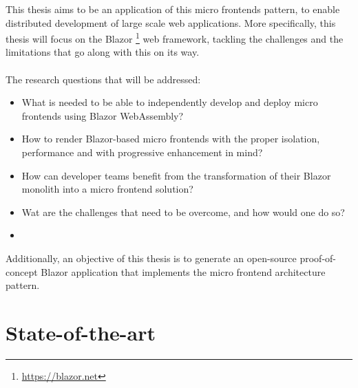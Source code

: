 This thesis aims to be an application of this micro frontends pattern, to enable
distributed development of large scale web applications. More specifically, this
thesis will focus on the Blazor \footnote{\href{https://blazor.net}{https://blazor.net}} web framework, tackling the challenges and the
limitations that go along with this on its way.\\\\\noindent The research
questions that will be addressed:
\begin{itemize}
    \item What is needed to be able to independently develop and deploy micro
    frontends using Blazor WebAssembly?
    \item How to render Blazor-based micro frontends with the proper isolation,
    performance and with progressive enhancement in mind?
    \item How can developer teams benefit from the transformation of their
    Blazor monolith into a micro frontend solution?
    \item Wat are the challenges that need to be overcome, and how would one do
    so? 
    \item[]
\end{itemize}

\noindent Additionally, an objective of this thesis is to generate an open-source
proof-of-concept Blazor application that implements the micro frontend
architecture pattern.

\section{State-of-the-art}
\label{sec:state-of-the-art}

%
%

